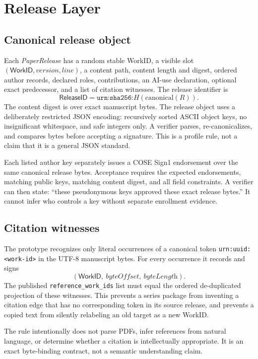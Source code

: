 \documentclass[11pt]{article}
\newcommand{\workid}{\textsf{WorkID}}
\newcommand{\releaseid}{\textsf{ReleaseID}}
\begin{document}
\section{Release Layer}

\subsection{Canonical release object}

Each \emph{PaperRelease} has a random stable \workid, a visible slot $(\workid,\textit{version},\textit{line})$, a content path, content length and digest, ordered author records, declared roles, contributions, an AI-use declaration, optional exact predecessor, and a list of citation witnesses. The release identifier is
\[
  \releaseid = \texttt{urn:sha256:}H(\mathrm{canonical}(R)).
\]
The content digest is over exact manuscript bytes. The release object uses a deliberately restricted JSON encoding: recursively sorted ASCII object keys, no insignificant whitespace, and safe integers only. A verifier parses, re-canonicalizes, and compares bytes before accepting a signature. This is a profile rule, not a claim that it is a general JSON standard.

Each listed author key separately issues a COSE Sign1 endorsement over the same canonical release bytes. Acceptance requires the expected endorsements, matching public keys, matching content digest, and all field constraints. A verifier can then state: ``these pseudonymous keys approved these exact release bytes.'' It cannot infer who controls a key without separate enrollment evidence.

\subsection{Citation witnesses}

The prototype recognizes only literal occurrences of a canonical token \texttt{urn:uuid:<work-id>} in the UTF-8 manuscript bytes. For every occurrence it records and signs
\[
  (\workid,\ \textit{byteOffset},\ \textit{byteLength}).
\]
The published \texttt{reference\_work\_ids} list must equal the ordered de-duplicated projection of these witnesses. This prevents a series package from inventing a citation edge that has no corresponding token in its source release, and prevents a copied text from silently relabeling an old target as a new \workid.

The rule intentionally does not parse PDFs, infer references from natural language, or determine whether a citation is intellectually appropriate. It is an exact byte-binding contract, not a semantic understanding claim.
\end{document}
